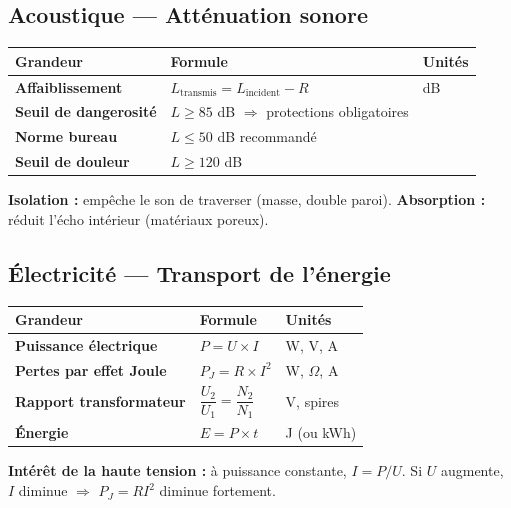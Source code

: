 \documentclass[a4paper,11pt]{article}
\begin{document}
\begin{formulairebox}

\subsection*{Acoustique — Atténuation sonore}

\begin{tabular}{>{\bfseries}p{4.5cm} p{5.5cm} p{4cm}}
\toprule
\textbf{Grandeur} & \textbf{Formule} & \textbf{Unités} \\
\midrule
Affaiblissement & $L_{\text{transmis}} = L_{\text{incident}} - R$ & dB \\[4pt]
Seuil de dangerosité & $L \geq 85$ dB $\Rightarrow$ protections obligatoires & \\[4pt]
Norme bureau & $L \leq 50$ dB recommandé & \\[4pt]
Seuil de douleur & $L \geq 120$ dB & \\[4pt]
\bottomrule
\end{tabular}

\smallskip
\textbf{Isolation :} empêche le son de traverser (masse, double paroi). \quad \textbf{Absorption :} réduit l'écho intérieur (matériaux poreux).

\subsection*{Électricité — Transport de l'énergie}

\begin{tabular}{>{\bfseries}p{4.5cm} p{5.5cm} p{4cm}}
\toprule
\textbf{Grandeur} & \textbf{Formule} & \textbf{Unités} \\
\midrule
Puissance électrique & $P = U \times I$ & W, V, A \\[4pt]
Pertes par effet Joule & $P_J = R \times I^2$ & W, $\Omega$, A \\[4pt]
Rapport transformateur & $\dfrac{U_2}{U_1} = \dfrac{N_2}{N_1}$ & V, spires \\[6pt]
Énergie & $E = P \times t$ & J (ou kWh) \\[4pt]
\bottomrule
\end{tabular}

\smallskip
\textbf{Intérêt de la haute tension :} à puissance constante, $I = P/U$. Si $U$ augmente, $I$ diminue $\Rightarrow$ $P_J = RI^2$ diminue fortement.

\end{formulairebox}
\end{document}

